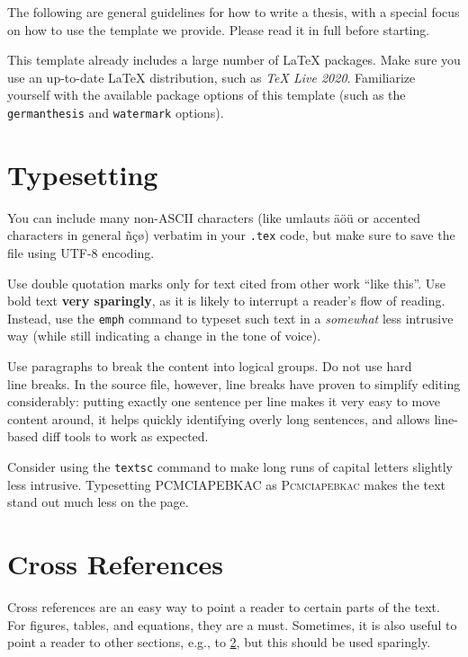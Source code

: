 \documentclass[]{ccs-thesis}
\begin{document}
The following are general guidelines for how to write a thesis, with a special focus on how to use the template we provide.
Please read it in full before starting.

This template already includes a large number of LaTeX packages.
Make sure you use an up-to-date LaTeX distribution, such as \emph{TeX Live 2020}.
Familiarize yourself with the available package options of this template (such as the \texttt{germanthesis} and \texttt{watermark} options).


\section{Typesetting}

You can include many non-ASCII characters (like umlauts äöü or accented characters in general ñçø) verbatim in your \texttt{.tex} code, but make sure to save the file using UTF-8 encoding.

Use double quotation marks only for text cited from other work ``like this''.
Use bold text \textbf{very sparingly}, as it is likely to interrupt a reader's flow of reading.
Instead, use the \texttt{emph} command to typeset such text in a \emph{somewhat} less intrusive way (while still indicating a change in the tone of voice).

Use paragraphs to break the content into logical groups.
Do not use hard\\ line breaks. In the source file, however, line breaks have proven to simplify editing considerably: putting exactly one sentence per line makes it very easy to move content around, it helps quickly identifying overly long sentences, and allows line-based diff tools to work as expected.

Consider using the \texttt{textsc} command to make long runs of capital letters slightly less intrusive.
Typesetting PCMCIAPEBKAC as \textsc{Pcmciapebkac} makes the text stand out much less on the page.


\section{Cross References}
\label{sec:cross-ref}

Cross references are an easy way to point a reader to certain parts of the text.
For figures, tables, and equations, they are a must.
Sometimes, it is also useful to point a reader to other sections, e.g., to \cref{sec:cross-ref}, but this should be used sparingly.
\end{document}
